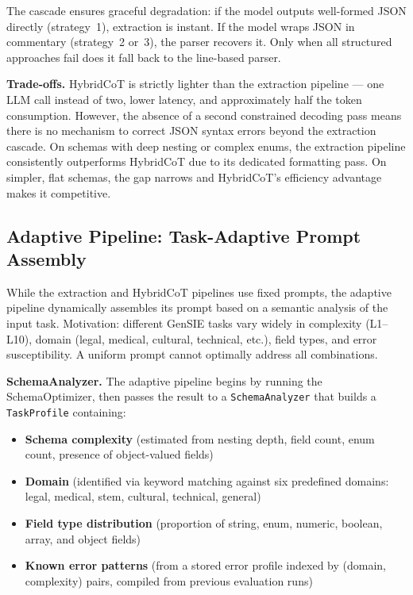 \documentclass{ceurart}
\begin{document}
The cascade ensures graceful degradation: if the model outputs well-formed JSON
directly (strategy~1), extraction is instant.
If the model wraps JSON in commentary (strategy~2 or~3), the parser recovers it.
Only when all structured approaches fail does it fall back to the line-based parser.

\textbf{Trade-offs.}
HybridCoT is strictly lighter than the extraction pipeline --- one LLM call instead of
two, lower latency, and approximately half the token consumption.
However, the absence of a second constrained decoding pass means there is no mechanism
to correct JSON syntax errors beyond the extraction cascade.
On schemas with deep nesting or complex enums, the extraction pipeline consistently
outperforms HybridCoT due to its dedicated formatting pass.
On simpler, flat schemas, the gap narrows and HybridCoT's efficiency advantage makes
it competitive.

\subsection{Adaptive Pipeline: Task-Adaptive Prompt Assembly}

While the extraction and HybridCoT pipelines use fixed prompts, the adaptive pipeline
dynamically assembles its prompt based on a semantic analysis of the input task.
Motivation: different GenSIE tasks vary widely in complexity (L1--L10), domain (legal,
medical, cultural, technical, etc.), field types, and error susceptibility.
A uniform prompt cannot optimally address all combinations.

\textbf{SchemaAnalyzer.}
The adaptive pipeline begins by running the SchemaOptimizer, then passes the result
to a \texttt{SchemaAnalyzer} that builds a \texttt{TaskProfile} containing:

\begin{itemize}
\item \textbf{Schema complexity} (estimated from nesting depth, field count, enum
  count, presence of object-valued fields)
\item \textbf{Domain} (identified via keyword matching against six predefined domains:
  legal, medical, stem, cultural, technical, general)
\item \textbf{Field type distribution} (proportion of string, enum, numeric, boolean,
  array, and object fields)
\item \textbf{Known error patterns} (from a stored error profile indexed by
  (domain, complexity) pairs, compiled from previous evaluation runs)
\end{itemize}
\end{document}
